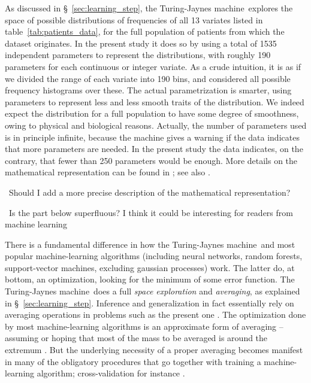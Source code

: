 \documentclass[utf8]{FrontiersinHarvard} %
\newcommand*{\pencil}{{\fontencoding{U}\fontfamily{fontawesometwo}\selectfont\symbol{210}}}
\newcommand{\mynotep}[1]{{\color{notecolour}\pencil\ #1}}
\newcommand*{\sect}{\S}%
\newcommand*{\sects}{\S\S}%
\newcommand*{\chap}{ch.}%
\renewcommand*{\|}[1][]{\nonscript\:#1\vert\nonscript\:\mathopen{}}
\newcommand*{\tjm}{Turing-Jaynes machine}
\begin{document}
As discussed in \sect~\ref{sec:learning_step}, the \tjm\ explores the space of possible distributions of frequencies of all 13 variates listed in table~\ref{tab:patients_data}, for the full population of patients from which the dataset originates. In the present study it does so by using a total of 1535 independent parameters to represent the distributions, with roughly 190 parameters for each continuous or integer variate. As a crude intuition, it is as if we divided the range of each variate into 190 bins, and considered all possible frequency histograms over these. The actual parametrization is smarter, using parameters to represent less and less smooth traits of the distribution. We indeed expect the distribution for a full population to have some degree of smoothness, owing to physical and biological reasons. Actually, the number of parameters used is in principle infinite, because the machine gives a warning if the data indicates that more parameters are needed. In the present study the data indicates, on the contrary, that fewer than 250 parameters would be enough. More details on the mathematical representation can be found in \cite{dunsonetal2011}; see also \cite{rossi2014,rasmussen1999}.

\mynotep{Should I add a more precise description of the mathematical representation?}

\mynotep{Is the part below superfluous? I think it could be interesting for readers from machine learning}

There is a fundamental difference in how the \tjm\ and most popular machine-learning algorithms (including neural networks, random forests, support-vector machines, excluding gaussian processes) work. The latter do, at bottom, an optimization, looking for the minimum of some error function. The \tjm\ does a full \emph{space exploration} and \emph{averaging}, as explained in \sect~\ref{sec:learning_step}. Inference and generalization in fact essentially rely on averaging operations in problems such as the present one \citetext{de~Finetti's \citeyear{definetti1930} theorem; \citealp{definetti1937,dawid2013}; \citealp[\sects~4.2--4.3]{bernardoetal1994_r2000}; see also \citealp{selfetal1987}}. The optimization done by most machine-learning algorithms is an approximate form of averaging -- assuming or hoping that most of the mass to be averaged is around the extremum \citep[\chap~16]{mackay1992,murphy2012}. But the underlying necessity of a proper averaging becomes manifest in many of the obligatory procedures that go together with training a machine-learning algorithm; cross-validation for instance \citep{mackay1992b}.
\end{document}
